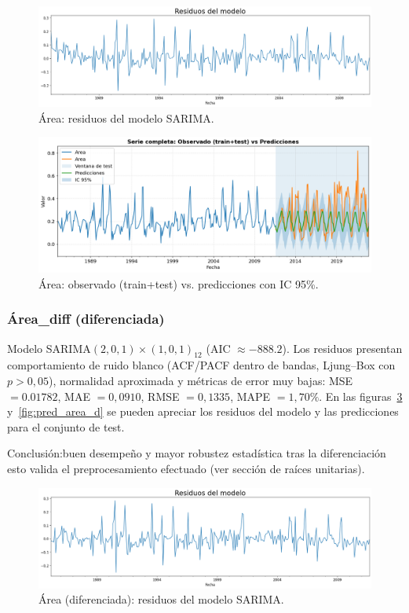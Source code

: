\begin{figure}[H]\centering
\includegraphics[scale=.30]{Figures/res_sarima_area.png}
\caption{Área: residuos del modelo SARIMA.}
\label{fig:res_area}
\end{figure}



\begin{figure}[H]\centering
\includegraphics[scale=.42]{Figures/pred_area.png}
\caption{Área: observado (train+test) vs. predicciones con IC 95\%.}
\label{fig:pred_area}
\end{figure}


\subsubsection{Área\_diff (diferenciada)}
Modelo SARIMA$(2,0,1)\times(1,0,1)_{12}$
(AIC $\approx -888.2$). Los residuos presentan comportamiento de ruido blanco (ACF/PACF dentro
de bandas, Ljung--Box con $p>0,05$), normalidad aproximada y métricas de error muy bajas:
MSE $=0.01782$, MAE $=0,0910$, RMSE $=0,1335$, MAPE $=1,70\%$. En las figuras~\ref{fig:res_area_d} y~\ref{fig:pred_area_d} se pueden apreciar los residuos del modelo y las predicciones para el conjunto de test.

Conclusión:buen desempeño y mayor robustez estadística tras la diferenciación esto valida el preprocesamiento efectuado (ver sección de raíces unitarias).

\begin{figure}[H]\centering
\includegraphics[scale=.30]{Figures/res_sarima_area_d.png}
\caption{Área (diferenciada): residuos del modelo SARIMA.}
\label{fig:res_area_d}
\end{figure}


